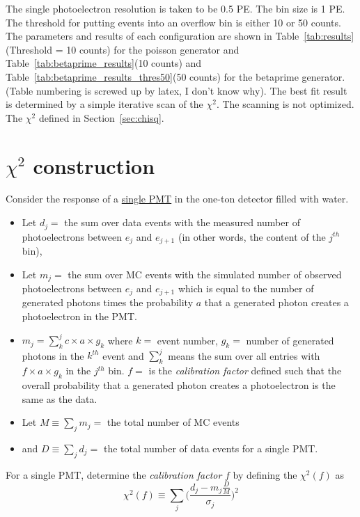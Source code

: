 \documentclass[12pt]{article}
\begin{document}
The single photoelectron resolution is taken to be 0.5 PE. The bin size is 1 PE. 
The threshold for putting events into an overflow bin is either 10 or 50 counts. 
The parameters and results of each configuration are shown in Table~\ref{tab:results}(Threshold = 10 counts) for the poisson generator and 
Table~\ref{tab:betaprime_results}(10 counts) and Table~\ref{tab:betaprime_results_thres50}(50 counts) for the betaprime generator. (Table numbering is screwed up by latex, I don't know why). 
The best fit result is determined by a simple iterative scan of the $\chi^2$. The scanning is not optimized. 
The $\chi^2$ defined in Section~\ref{sec:chisq}.

\section{$\chi^2$ construction \label{sec:chisq}}
Consider the response of a \underline{single PMT} in the one-ton detector filled with water.
  \begin{itemize}
	\item Let $d_j = $ the sum over data events with the measured number of photoelectrons between $e_j$ and 	
	$e_{j+1}$ (in other words, the content of the $j^{th}$ bin),
	\item Let $m_j = $ the sum over MC events with the simulated number of observed photoelectrons 
	between $e_j$ and $e_{j+1}$ which is equal to the number of generated photons times the probability $a$ that
	a generated photon creates a photoelectron in the PMT.
	\item $m_j  = \sum_k^j c\times a\times g_k$ 
	where $k=$ event number, 
	$g_k = $ number of generated photons in the $k^{th}$ event and 
	$\sum_k^j$ means the sum over all entries with 
	$f\times a\times g_k$ in the $j^{th}$ bin. 
	$f=$ is the {\em calibration factor} defined such that the overall probability that a generated photon creates a photoelectron is the same as the data. 
	\item Let $M \equiv \sum_j m_j = $ the total number of MC events 
	\item and $D \equiv \sum_j d_j = $ the total number of data events for a single PMT.
	
\end{itemize}
For a single PMT, determine the {\em calibration factor} $f$ by defining the $\chi^2(f)$ as
\begin{equation}\label{eqn:chisq}
	\chi^2(f) \equiv \sum_j \bigl( \frac{d_j - m_j \frac{D}{M}}{\sigma_j} \bigr)^2
\end{equation}
\end{document}
